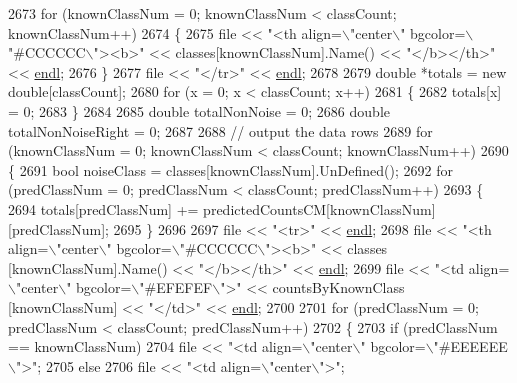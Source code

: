 \begin{DoxyCode}
{2673   \textcolor{keywordflow}{for}  (knownClassNum = 0;  knownClassNum < classCount;  knownClassNum++)
2674   \{
2675     file << \textcolor{stringliteral}{"<th align=\(\backslash\)"center\(\backslash\)" bgcolor=\(\backslash\)"#CCCCCC\(\backslash\)"><b>"} << classes[knownClassNum].Name() << \textcolor{stringliteral}{"</b></th>"} 
      << \hyperlink{namespace_k_k_b_ad1f50f65af6adc8fa9e6f62d007818a8}{endl};
2676   \}
2677   file  << \textcolor{stringliteral}{"</tr>"} << \hyperlink{namespace_k_k_b_ad1f50f65af6adc8fa9e6f62d007818a8}{endl};
2678 
2679   \textcolor{keywordtype}{double} *totals = \textcolor{keyword}{new} \textcolor{keywordtype}{double}[classCount];
2680   \textcolor{keywordflow}{for}  (x = 0; x < classCount; x++)
2681   \{
2682     totals[x] = 0;
2683   \}
2684 
2685   \textcolor{keywordtype}{double}  totalNonNoise = 0;
2686   \textcolor{keywordtype}{double}  totalNonNoiseRight = 0;
2687 
2688   \textcolor{comment}{// output the data rows}
2689   \textcolor{keywordflow}{for}  (knownClassNum = 0;  knownClassNum < classCount;  knownClassNum++)
2690   \{
2691     \textcolor{keywordtype}{bool}  noiseClass = classes[knownClassNum].UnDefined();
2692     \textcolor{keywordflow}{for}  (predClassNum = 0; predClassNum < classCount; predClassNum++)
2693     \{
2694       totals[predClassNum] += predictedCountsCM[knownClassNum] [predClassNum];
2695     \}
2696      
2697     file << \textcolor{stringliteral}{"<tr>"} << \hyperlink{namespace_k_k_b_ad1f50f65af6adc8fa9e6f62d007818a8}{endl};
2698     file << \textcolor{stringliteral}{"<th align=\(\backslash\)"center\(\backslash\)" bgcolor=\(\backslash\)"#CCCCCC\(\backslash\)"><b>"} << classes            [knownClassNum].Name() << \textcolor{stringliteral}{
      "</b></th>"} << \hyperlink{namespace_k_k_b_ad1f50f65af6adc8fa9e6f62d007818a8}{endl};
2699     file << \textcolor{stringliteral}{"<td align=\(\backslash\)"center\(\backslash\)" bgcolor=\(\backslash\)"#EFEFEF\(\backslash\)">"}    << countsByKnownClass [knownClassNum]        << \textcolor{stringliteral}{
      "</td>"}     << \hyperlink{namespace_k_k_b_ad1f50f65af6adc8fa9e6f62d007818a8}{endl};
2700 
2701     \textcolor{keywordflow}{for}  (predClassNum = 0; predClassNum < classCount; predClassNum++)
2702     \{
2703       \textcolor{keywordflow}{if} (predClassNum == knownClassNum)
2704         file << \textcolor{stringliteral}{"<td align=\(\backslash\)"center\(\backslash\)" bgcolor=\(\backslash\)"#EEEEEE\(\backslash\)">"};
2705       \textcolor{keywordflow}{else} 
2706         file << \textcolor{stringliteral}{"<td align=\(\backslash\)"center\(\backslash\)">"};
}
\end{DoxyCode}
